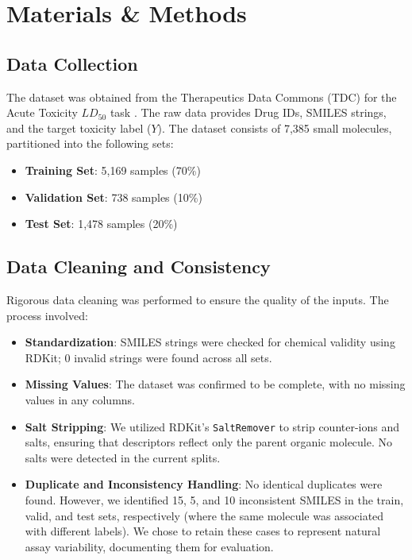 \documentclass[10pt,a4paper,twocolumn]{article}
\begin{document}
\section{Materials \& Methods}

\subsection{Data Collection}

The dataset was obtained from the Therapeutics Data Commons (TDC) for the Acute
Toxicity $LD_{50}$ task \cite{TDC_LD50}. The raw data provides Drug IDs, SMILES
strings, and the target toxicity label ($Y$). The dataset consists of 7,385
small molecules, partitioned into the following sets:

\begin{itemize}
    \item \textbf{Training Set}: 5,169 samples (70\%)
    \item \textbf{Validation Set}: 738 samples (10\%)
    \item \textbf{Test Set}: 1,478 samples (20\%)
\end{itemize}

\subsection{Data Cleaning and Consistency}

Rigorous data cleaning was performed to ensure the quality of the inputs. The
process involved:

\begin{itemize}
    \item \textbf{Standardization}: SMILES strings were checked for chemical
    validity using RDKit; 0 invalid strings were found across all sets.

    \item \textbf{Missing Values}: The dataset was confirmed to be complete,
    with no missing values in any columns.

    \item \textbf{Salt Stripping}: We utilized RDKit's \texttt{SaltRemover} to
    strip counter-ions and salts, ensuring that descriptors reflect only the
    parent organic molecule. No salts were detected in the current splits.

    \item \textbf{Duplicate and Inconsistency Handling}: No identical duplicates
    were found. However, we identified 15, 5, and 10 inconsistent SMILES in the
    train, valid, and test sets, respectively (where the same molecule was
    associated with different labels). We chose to retain these cases to
    represent natural assay variability, documenting them for evaluation.
\end{itemize}
\end{document}
